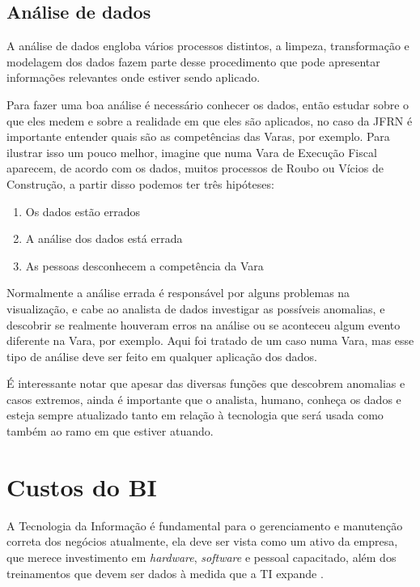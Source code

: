 \subsection{Análise de dados}

A análise de dados engloba vários processos distintos, a limpeza, transformação e modelagem dos dados fazem parte desse procedimento que pode apresentar informações relevantes onde estiver sendo aplicado. 

Para fazer uma boa análise é necessário conhecer os dados, então estudar sobre o que eles medem e sobre a realidade em que eles são aplicados, no caso da JFRN é importante entender quais são as competências das Varas, por exemplo. Para ilustrar isso um pouco melhor, imagine que numa Vara de Execução Fiscal aparecem, de acordo com os dados, muitos processos de Roubo ou Vícios de Construção, a partir disso podemos ter três hipóteses:

\begin{enumerate}
	\item Os dados estão errados
	\item A análise dos dados está errada
	\item As pessoas desconhecem a competência da Vara
\end{enumerate}

Normalmente a análise errada é responsável por alguns problemas na visualização, e cabe ao analista de dados investigar as possíveis anomalias, e descobrir se realmente houveram erros na análise ou se aconteceu algum evento diferente na Vara, por exemplo. Aqui foi tratado de um caso numa Vara, mas esse tipo de análise deve ser feito em qualquer aplicação dos dados.

É interessante notar que apesar das diversas funções que descobrem anomalias e casos extremos, ainda é importante que o analista, humano, conheça os dados e esteja sempre atualizado tanto em relação à tecnologia que será usada como também ao ramo em que estiver atuando.


\section{Custos do BI}

A Tecnologia da Informação é fundamental para o gerenciamento e manutenção correta dos negócios atualmente, ela deve ser vista como um ativo da empresa, que merece investimento em \textit{hardware}, \textit{software} e pessoal capacitado, além dos treinamentos que devem ser dados à medida que a TI expande \cite{negash1}.

